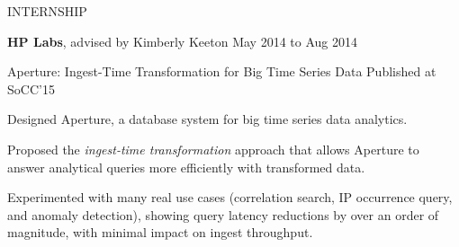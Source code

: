 \documentclass{resume} %
\begin{document}
\begin{rSection}{INTERNSHIP}

\hspace{-1em} \textbf{HP Labs}, advised by Kimberly Keeton \hfill {May 2014 to Aug 2014}

\vspace{-.1in}
\begin{rSubsection}{\hspace{-1em} Aperture: Ingest-Time Transformation for Big Time Series Data}{}
{Published at SoCC'15}{}
\vspace{-0.3em}
\item Designed Aperture, a database system for big time series data analytics.
\item Proposed the \emph{ingest-time transformation} approach that allows Aperture to answer analytical queries more efficiently with transformed data.
\item Experimented with many real use cases (correlation search, IP occurrence query, and anomaly detection), showing query latency reductions by over an order of magnitude, with minimal impact on ingest throughput.
\end{rSubsection}

\end{rSection}
\vspace{-.05in}
\end{document}
